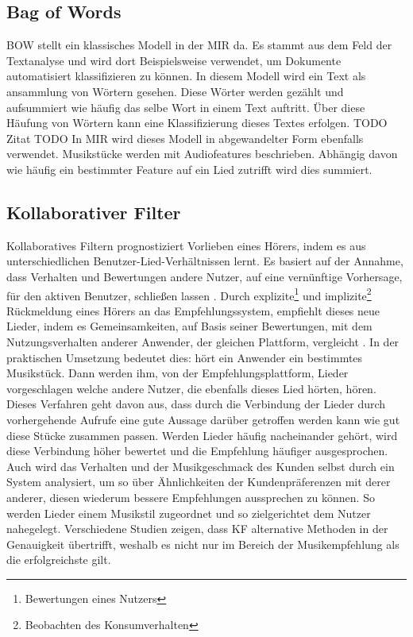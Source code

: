 \documentclass[twosided,a4,10pt]{article}
\begin{document}
\begin{multicols}{2}
		\subsection{Bag of Words}
		BOW stellt ein klassisches Modell in der MIR da. Es stammt aus dem Feld der Textanalyse und wird dort Beispielsweise verwendet, um Dokumente automatisiert klassifizieren zu können. In diesem Modell wird ein Text als ansammlung von Wörtern gesehen. Diese Wörter werden gezählt und aufsummiert wie häufig das selbe Wort in einem Text auftritt. Über diese Häufung von Wörtern kann eine Klassifizierung dieses Textes erfolgen. TODO Zitat TODO In MIR wird dieses Modell in abgewandelter Form ebenfalls verwendet. Musikstücke werden mit Audiofeatures beschrieben. Abhängig davon wie häufig ein bestimmter Feature auf ein Lied zutrifft wird dies summiert.
		\subsection{Kollaborativer Filter}
		Kollaboratives Filtern prognostiziert Vorlieben eines Hörers, indem es aus unterschiedlichen Benutzer-Lied-Verhältnissen lernt. Es basiert auf der Annahme, dass Verhalten und Bewertungen andere Nutzer, auf eine vernünftige Vorhersage, für den aktiven Benutzer, schließen lassen \cite{celma}. Durch explizite\footnote[4]{ Bewertungen eines Nutzers} und implizite\footnote[5]{Beobachten des Konsumverhalten} Rückmeldung eines Hörers an das Empfehlungssystem, empfiehlt dieses neue Lieder, indem es Gemeinsamkeiten, auf Basis seiner Bewertungen, mit dem Nutzungsverhalten anderer Anwender, der gleichen Plattform, vergleicht \cite{mcfee}.\newline
		In der praktischen Umsetzung bedeutet dies: hört ein Anwender ein bestimmtes Musikstück. Dann werden ihm, von der Empfehlungsplattform, Lieder vorgeschlagen welche andere Nutzer, die ebenfalls dieses Lied hörten, hören. Dieses Verfahren geht davon aus, dass durch die Verbindung der Lieder durch vorhergehende Aufrufe eine gute Aussage darüber getroffen werden kann wie gut diese Stücke zusammen passen. Werden Lieder häufig nacheinander gehört, wird diese Verbindung höher bewertet und die Empfehlung häufiger ausgesprochen. Auch wird das Verhalten und der Musikgeschmack des Kunden selbst durch ein System analysiert, um so über Ähnlichkeiten der Kundenpräferenzen mit derer anderer, diesen wiederum bessere Empfehlungen aussprechen zu können. So werden Lieder einem Musikstil zugeordnet und so zielgerichtet dem Nutzer nahegelegt.\newline
		Verschiedene Studien \cite{mcfee}\cite{barrington} zeigen, dass KF alternative Methoden in der Genauigkeit übertrifft, weshalb es nicht nur im Bereich der Musikempfehlung als die erfolgreichste gilt.\newline

\end{multicols}
\end{document}
